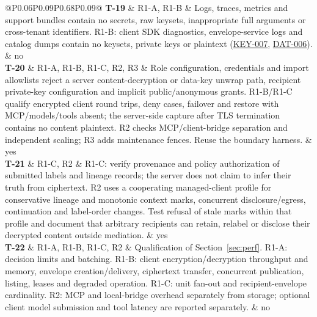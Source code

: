 \documentclass[11pt,a4paper]{article}
\newcommand{\rr}[1]{\hyperlink{req:#1}{#1}}
\newcommand{\testrow}[4]{\hypertarget{test:#1}{\textbf{#1}} & #2 & #3 & #4\\}
\begin{document}
\begin{longtable}{@{}P{0.06\textwidth}P{0.09\textwidth}P{0.68\textwidth}P{0.09\textwidth}@{}}
\testrow{T-19}{R1-A, R1-B}{Logs, traces, metrics and support bundles contain no secrets, raw keysets, inappropriate full arguments or cross-tenant identifiers. R1-B: client SDK diagnostics, envelope-service logs and catalog dumps contain no keysets, private keys or plaintext (\rr{KEY-007}, \rr{DAT-006}).}{no}
\testrow{T-20}{R1-A, R1-B, R1-C, R2, R3}{Role configuration, credentials and import allowlists reject a server content-decryption or data-key unwrap path, recipient private-key configuration and implicit public/anonymous grants. R1-B/R1-C qualify encrypted client round trips, deny cases, failover and restore with MCP/models/tools absent; the server-side capture after TLS termination contains no content plaintext. R2 checks MCP/client-bridge separation and independent scaling; R3 adds maintenance fences. Reuse the boundary harness.}{yes}
\testrow{T-21}{R1-C, R2}{R1-C: verify provenance and policy authorization of submitted labels and lineage records; the server does not claim to infer their truth from ciphertext. R2 uses a cooperating managed-client profile for conservative lineage and monotonic context marks, concurrent disclosure/egress, continuation and label-order changes. Test refusal of stale marks within that profile and document that arbitrary recipients can retain, relabel or disclose their decrypted content outside mediation.}{yes}
\testrow{T-22}{R1-A, R1-B, R1-C, R2}{Qualification of Section~\ref{sec:perf}. R1-A: decision limits and batching. R1-B: client encryption/decryption throughput and memory, envelope creation/delivery, ciphertext transfer, concurrent publication, listing, leases and degraded operation. R1-C: unit fan-out and recipient-envelope cardinality. R2: MCP and local-bridge overhead separately from storage; optional client model submission and tool latency are reported separately.}{no}
\bottomrule
\end{longtable}
\end{document}
